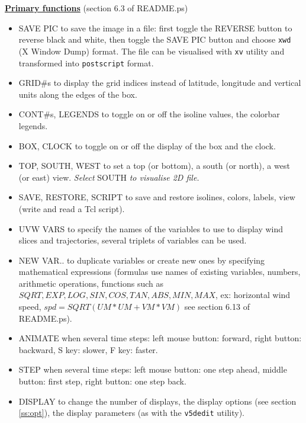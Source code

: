 \underline{\bf Primary functions} \label{sss:funct}(section 6.3 of README.ps)
\begin{itemize}
\item{\sf SAVE PIC} to save the image in a file: first toggle the {\sf REVERSE}
button to reverse black and white, then toggle the {\sf SAVE PIC} button and
choose {\tt xwd} (X Window Dump) format. The file can be visualised with
 {\tt xv} utility and transformed into {\tt postscript} format.

\item{\sf GRID\#s} to display the grid indices instead of latitude, longitude and
vertical units along the edges of the box.

\item{\sf CONT\#s, LEGENDS} to toggle on or off the isoline values, the colorbar
legends.

\item{\sf BOX, CLOCK} to toggle on or off the display of the box and the clock.

\item{\sf TOP, SOUTH, WEST} to set a top (or bottom), a south (or north), a west
(or east) view.
{\it Select} {\sf SOUTH} {\it to visualise 2D file.}

\item{\sf SAVE, RESTORE, SCRIPT} to save and restore isolines, colors, labels,
view (write and read a Tcl script).

\item{\sf UVW VARS} to specify the names of the variables to use to display wind
slices and trajectories, several triplets of variables can be used.

\item{\sf NEW VAR..} to duplicate variables or create new ones by specifying
mathematical expressions (formulas use names of existing variables, numbers,
arithmetic operations, functions such as $SQRT,EXP,LOG,SIN,COS,TAN,ABS,MIN,MAX$,
ex: horizontal wind speed, $spd=SQRT(UM*UM+VM*VM)$
see section 6.13 of README.ps).

\item{\sf ANIMATE} when several time steps: left mouse button: forward,
right button: backward, S key: slower, F key: faster.

\item{\sf STEP} when several time steps: left mouse button: one step ahead,
 middle button: first step, right button: one step back.

\item{\sf DISPLAY} to change the number of displays, the display options
(see section \ref{ss:opt}), the display parameters (as with the {\tt v5dedit}
utility).

\end{itemize}

